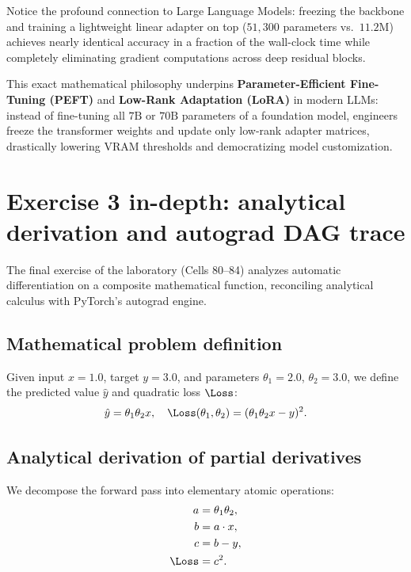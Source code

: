 \documentclass[../labs.tex]{subfiles}
\begin{document}
\begin{intuition}
Notice the profound connection to Large Language Models: freezing the backbone and training a lightweight linear adapter on top ($51{,}300$ parameters vs.\ $11.2\text{M}$) achieves nearly identical accuracy in a fraction of the wall-clock time while completely eliminating gradient computations across deep residual blocks.

This exact mathematical philosophy underpins \textbf{Parameter-Efficient Fine-Tuning (PEFT)} and \textbf{Low-Rank Adaptation (LoRA)} in modern LLMs: instead of fine-tuning all $7\text{B}$ or $70\text{B}$ parameters of a foundation model, engineers freeze the transformer weights and update only low-rank adapter matrices, drastically lowering VRAM thresholds and democratizing model customization.
\end{intuition}


\section{Exercise 3 in-depth: analytical derivation and autograd DAG trace}

The final exercise of the laboratory (Cells 80--84) analyzes automatic differentiation on a composite mathematical function, reconciling analytical calculus with PyTorch's autograd engine.

\subsection{Mathematical problem definition}
Given input $x = 1.0$, target $y = 3.0$, and parameters $\theta_1 = 2.0$, $\theta_2 = 3.0$, we define the predicted value $\hat{y}$ and quadratic loss $\Loss$:
\begin{equation}
\label{eq:lab01_ex3_loss}
\hat{y} = \theta_1 \theta_2 x, \quad \Loss(\theta_1, \theta_2) = (\theta_1 \theta_2 x - y)^2.
\end{equation}

\subsection{Analytical derivation of partial derivatives}
We decompose the forward pass into elementary atomic operations:
\begin{align}
a &= \theta_1 \theta_2, \\
b &= a \cdot x, \\
c &= b - y, \\
\Loss &= c^2.
\end{align}
\end{document}
